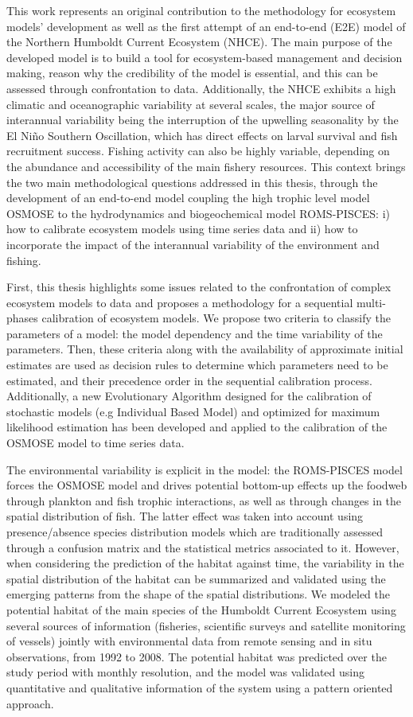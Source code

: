 
This work represents an original contribution to the methodology for ecosystem models’ development as well as the first attempt of an end-to-end (E2E) model of the Northern Humboldt Current Ecosystem (NHCE). The main purpose of the developed model is to build a tool for ecosystem-based management and decision making, reason why the credibility of the model is essential, and this can be assessed through confrontation to data. Additionally, the NHCE exhibits a high climatic and oceanographic variability at several scales, the major source of interannual variability being the interruption of the upwelling seasonality by the El Niño Southern Oscillation, which has direct effects on larval survival and fish recruitment success. Fishing activity can also be highly variable, depending on the abundance and accessibility of the main fishery resources. This context brings the two main methodological questions addressed in this thesis, through the development of an end-to-end model coupling the high trophic level model OSMOSE to the hydrodynamics and biogeochemical model ROMS-PISCES: i) how to calibrate ecosystem models using time series data and ii) how to incorporate the impact of the interannual variability of the environment and fishing.


First, this thesis highlights some issues related to the confrontation of complex ecosystem models to data and proposes a methodology for a sequential multi-phases calibration of ecosystem models. We propose two criteria to classify the parameters of a model: the model dependency and the time variability of the parameters. Then, these criteria along with the availability of approximate initial estimates are used as decision rules to determine which parameters need to be estimated, and their precedence order in the sequential calibration process. Additionally, a new Evolutionary Algorithm designed for the calibration of stochastic models (e.g Individual Based Model) and optimized for maximum likelihood estimation has been developed and applied to the calibration of the OSMOSE model to time series data.


The environmental variability is explicit in the model: the ROMS-PISCES model forces the OSMOSE model and drives potential bottom-up effects up the foodweb through plankton and fish trophic interactions, as well as through changes in the spatial distribution of fish. The latter effect was taken into account using presence/absence species distribution models which are traditionally assessed through a confusion matrix and the statistical metrics associated to it. However, when considering the prediction of the habitat against time, the variability in the spatial distribution of the habitat can be summarized and validated using the emerging patterns from the shape of the spatial distributions. We modeled the potential habitat of the main species of the Humboldt Current Ecosystem using several sources of information (fisheries, scientific surveys and satellite monitoring of vessels) jointly with environmental data from remote sensing and in situ observations, from 1992 to 2008. The potential habitat was predicted over the study period with monthly resolution, and the model was validated using quantitative and qualitative information of the system using a pattern oriented approach.


